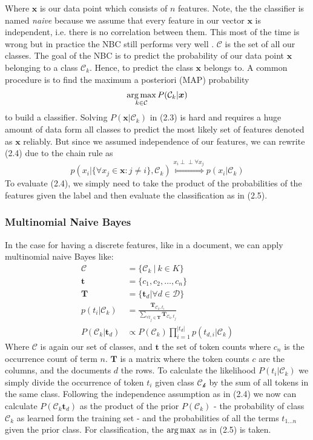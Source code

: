 Where $\boldsymbol{x}$ is our data point which consists of $n$ features. Note, the the classifier is named \textsl{naive} because we assume that every feature in our vector $\boldsymbol{x}$ is independent, i.e. there is no correlation between them. This most of the time is wrong but in practice the NBC still performs very well \citep{Rish2001}. $\mathcal{C}$ is the set of all our classes. The goal of the NBC is to predict the probability of our data point $\boldsymbol{x}$ belonging to a class $\mathcal{C}_k$. Hence, to predict the class $\boldsymbol{x}$ belongs to. A common procedure is to find the maximum a posteriori (MAP) probability
\begin{gather}
  \operatorname*{arg\,max}_{k \in \mathcal{C}} P(\mathcal{C}_k|\boldsymbol{x})
\end{gather}
to build a classifier.
 Solving $P(\boldsymbol{x} |\mathcal{C}_k)$ in (2.3) is hard and requires a huge amount of data form all classes to predict the most likely set of features denoted as $\boldsymbol{x}$ reliably. But since we assumed independence of our features, we can rewrite (2.4) due to the chain rule as
 \[p(x_i| \{\forall x_j \in \boldsymbol{x} : j \neq i \}, \mathcal{C}_k) \overset{x_i\perp\!\!\!\perp \forall x_j}{\Longleftrightarrow} p(x_i|\mathcal{C}_k)\]
 To evaluate (2.4), we simply need to take the product of the probabilities of the features given the label and then evaluate the classification as in (2.5).

\subsubsection{Multinomial Naive Bayes}
In the case for having a discrete features, like in a document, we can apply multinomial naive Bayes like:
\begin{align}
  \mathcal{C} &= \{\mathcal{C}_k \: | \: k \in K \} \\
  \boldsymbol{t} &= \{c_1, c_2, \dots, c_n\} \\
  \boldsymbol{T} &= \{\boldsymbol{t}_d | \forall d \in \mathcal{D}\} \\
  p({t_{i}}|\mathcal{C}_k) &= \frac{\boldsymbol{T}_{\mathcal{C}_k,t_{i}}}{\sum_{\forall t_j \in \boldsymbol{T}}\boldsymbol{T}_{\mathcal{C}_k,t_j}} \\
  P(\mathcal{C}_k|\boldsymbol{t}_d) &\propto P(\mathcal{C}_k) \prod_{i=1}^{|t_{d}|}  p(t_{d,i}|\mathcal{C}_k)
\end{align}
Where $\mathcal{C}$ is again our set of classes, and $\boldsymbol{t}$ the set of token counts where $c_n$ is the occurrence count of term $n$. $\boldsymbol{T}$ is a matrix where the token counts $c$ are the columns, and the documents $d$ the rows. To calculate the likelihood $P({t_{i}}|\mathcal{C}_k)$ we simply divide the occurrence of token $t_i$ given class $\mathcal{C_k}$ by the sum of all tokens in the same class. Following the independence assumption as in (2.4) we now can calculate $P(\mathcal{C}_k\boldsymbol{t}_d)$ as the product of the prior $P(\mathcal{C}_k)$ - the probability of class $\mathcal{C}_k$
as learned form the training set - and the probabilities of all the terms $t_{1 \dots n}$ given the prior class. For classification, the $\operatorname*{arg\,max}$ as in (2.5) is taken.

